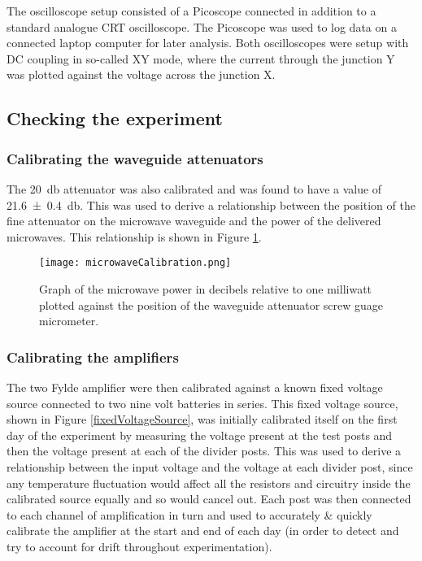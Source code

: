 \documentclass[11pt]{article}
\begin{document}
The oscilloscope setup consisted of a Picoscope connected in addition to a standard analogue CRT oscilloscope. The Picoscope was used to log data on a connected laptop computer for later analysis. Both oscilloscopes were setup with DC coupling in so-called XY mode, where the current through the junction Y was plotted against the voltage across the junction X.

\subsection{Checking the experiment}
\subsubsection{Calibrating the waveguide attenuators}
The \SI{20}{\decibel} attenuator was also calibrated and was found to have a value of \SI{21.6 \pm 0.4}{\decibel}. This was used to derive a relationship between the position of the fine attenuator on the microwave waveguide and the power of the delivered microwaves. This relationship is shown in Figure \ref{microwaveCalibration}.

\begin{figure}[H]
	\centering
	\texttt{[image: microwaveCalibration.png]}
	\caption{Graph of the microwave power in decibels relative to one milliwatt plotted against the position of the waveguide attenuator screw guage micrometer.}
	\label{microwaveCalibration}
\end{figure}

\subsubsection{Calibrating the amplifiers}
The two Fylde amplifier were then calibrated against a known fixed voltage source connected to two nine volt batteries in series. This fixed voltage source, shown in Figure \ref{fixedVoltageSource}, was initially calibrated itself on the first day of the experiment by measuring the voltage present at the test posts and then the voltage present at each of the divider posts. This was used to derive a relationship between the input voltage and the voltage at each divider post, since any temperature fluctuation would affect all the resistors and circuitry inside the calibrated source equally and so would cancel out. Each post was then connected to each channel of amplification in turn and used to accurately \& quickly calibrate the amplifier at the start and end of each day (in order to detect and try to account for drift throughout experimentation).
\end{document}
